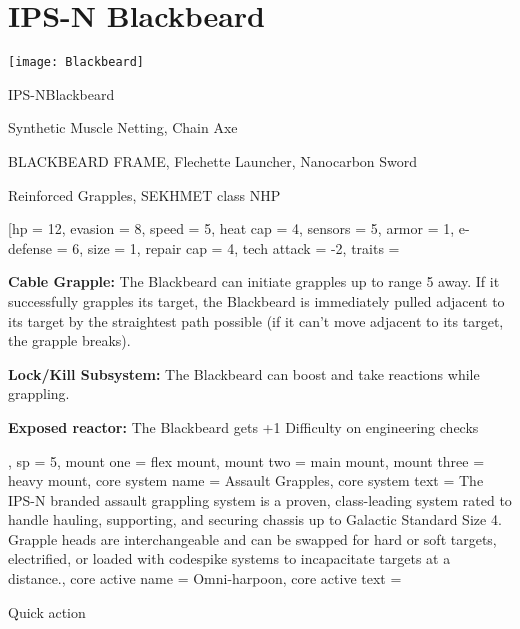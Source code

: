 \section{IPS-N Blackbeard}

\begin{center}
    \texttt{[image: Blackbeard]}
\end{center}

\begin{mech}{IPS-N}{Blackbeard}


\begin{license}
\item Synthetic Muscle Netting, Chain Axe
\item BLACKBEARD FRAME, Flechette Launcher, Nanocarbon Sword
\item Reinforced Grapples, SEKHMET class NHP
\end{license}

\frameBox
[hp = 12,
evasion = 8,
speed = 5,
heat cap = 4,
sensors = 5,
armor = 1,
e-defense = 6,
size = 1,
repair cap = 4,
tech attack = -2,
traits = {\textbf{Cable Grapple:} The Blackbeard can initiate grapples up to range 5 away. If it successfully grapples its target, the Blackbeard is immediately pulled adjacent to its target by the straightest path possible (if it can’t move adjacent to its target, the grapple breaks).

\textbf{Lock/Kill Subsystem:} The Blackbeard can boost and take reactions while grappling.

\textbf{Exposed reactor:} The Blackbeard gets +1 Difficulty on engineering checks},
sp = 5,
mount one = flex mount,
mount two = main mount,
mount three = heavy mount,
core system name = Assault Grapples,
core system text = {The IPS-N branded assault grappling system is a proven, class-leading system rated to handle hauling, supporting, and securing chassis up to Galactic Standard Size 4. Grapple heads are interchangeable and can be swapped for hard or soft targets, electrified, or loaded with codespike systems to incapacitate targets at a distance.},
core active name = Omni-harpoon,
core active text = {Quick action

}
\end{mech}
